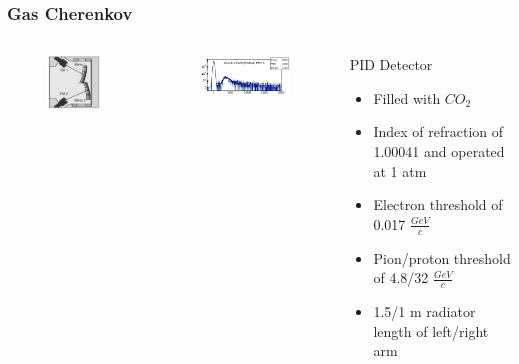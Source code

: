 \documentclass{beamer}
\begin{document}
\begin{frame}
\frametitle{Gas Cherenkov}

	\begin{columns}
		\begin{figure}
			\includegraphics[width=3cm]{../images/Cher}
		\end{figure}
		\begin{figure}
			\includegraphics[width=5cm]{../images/cher_1pmt}
		\end{figure}
		\begin{block}{PID Detector}
		\begin{itemize}
			\item Filled with $CO_2$
			\item Index of refraction of 1.00041 and operated at 1 atm
			\item Electron threshold of 0.017 $\frac{GeV}{c}$
			\item Pion/proton threshold  of 4.8/32 $\frac{GeV}{c}$
			\item 1.5/1 m radiator length of left/right arm \cite{nim}
		\end{itemize}
		\end{block}
	\end{columns}
\end{frame}
\end{document}

